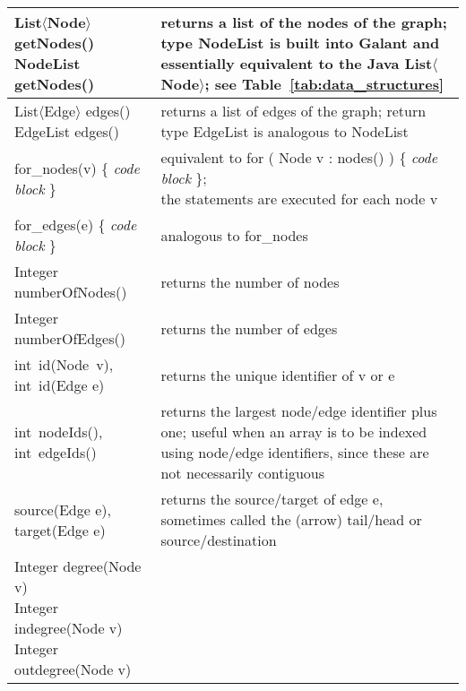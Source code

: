\begin{table}
  \small
  \centering
  \begin{tabular}{| m{} | m{} |}
    \hline
    \shortstack[l]{
      \textsf{List$\langle$Node$\rangle$ getNodes()}\\
      \textsf{NodeList getNodes()}
    }
    &
    returns a list of the nodes of the graph; type \textsf{NodeList}
    is built into Galant
    and essentially equivalent to the Java \textsf{List$\langle$Node$\rangle$};
    see Table~\ref{tab:data_structures}
    \\ \hline
    \shortstack[l]{
      \textsf{List$\langle$Edge$\rangle$ edges()}\\
      \textsf{EdgeList edges()}
    }
    &
    returns a list of edges of the graph; return type
    \textsf{EdgeList} is analogous to \textsf{NodeList}
    \\ \hline
    \textsf{for\_nodes(v) \{
      \emph{code block}
      \}}
    &
    \shortstack[l]{
      equivalent to
      \textsf{for ( Node v : nodes() ) \{ \emph{code block} \}};\\
      the statements are executed for each node \textsf{v}
    }
    \\ \hline
    \textsf{for\_edges(e)  \{ \emph{code block} \}}
    &
    analogous to \textsf{for\_nodes}
    \\ \hline
    \textsf{Integer numberOfNodes()}
    &
    returns the number of nodes
    \\ \hline
    \textsf{Integer numberOfEdges()}
    &
    returns the number of edges
    \\ \hline
    \textsf{int~id(Node~v)}, \textsf{int~id(Edge e)}
    &
    returns the unique identifier of \textsf{v} or \textsf{e}
    \\ \hline
    \textsf{int~nodeIds()}, \textsf{int~edgeIds()}
    &
    returns the largest node/edge identifier plus one;
    useful when an array is to be indexed using node/edge identifiers,
    since these are not necessarily contiguous
    \\ \hline
    \textsf{source(Edge e)}, \textsf{target(Edge e)}
    &
    returns the source/target of edge \textsf{e}, sometimes called the (arrow)
    tail/head or source/destination
    \\ \hline
    \shortstack[l]{
      \textsf{Integer degree(Node v)}\\
      \textsf{Integer indegree(Node v)}\\
      \textsf{Integer outdegree(Node v)}
    }
    &

\end{tabular}
\end{table}
